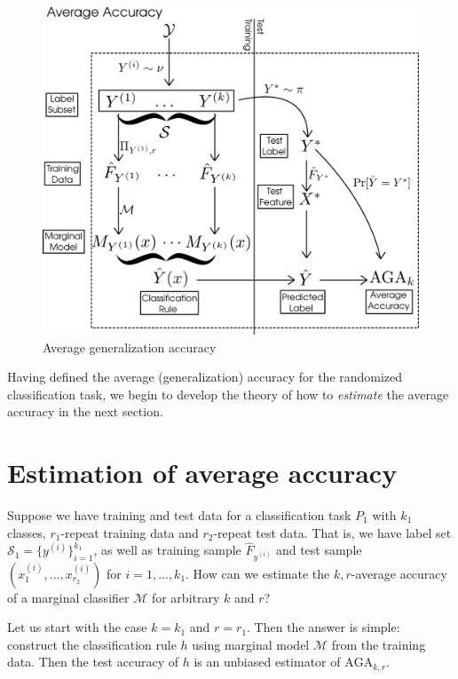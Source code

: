\begin{figure}[h]
\centering
\includegraphics[scale = 0.3]{../extrapolation_simple/average_risk.png}
\caption{Average generalization accuracy}\label{fig:average_risk}
\end{figure}

Having defined the average (generalization) accuracy for the randomized classification
task, we begin to develop the theory of how to \emph{estimate} the
average accuracy in the next section.

\section{Estimation of average accuracy}\label{sec:estimation_average_accuracy}

Suppose we have training and test data for a classification task $P_1$
with $k_1$ classes, $r_1$-repeat training data and $r_2$-repeat test
data.  That is, we have label set $\mathcal{S}_1 =
\{y^{(i)}\}_{i=1}^{k_1}$, as well as training sample $\hat{F}_{y^{(i)}}$
and test sample $(x_1^{(i)},\hdots, x_{r_2}^{(i)})$ for $i =
1,\hdots, k_1$.  How can we estimate the $k, r$-average accuracy of a
marginal classifier $\mathcal{M}$ for arbitrary $k$ and $r$?

Let us start with the case $k = k_1$ and $r = r_1$.  Then the answer
is simple: construct the classification rule $h$ using marginal model
$\mathcal{M}$ from the training data.  Then the test accuracy of $h$ is an
unbiased estimator of $\text{AGA}_{k,r}$.

